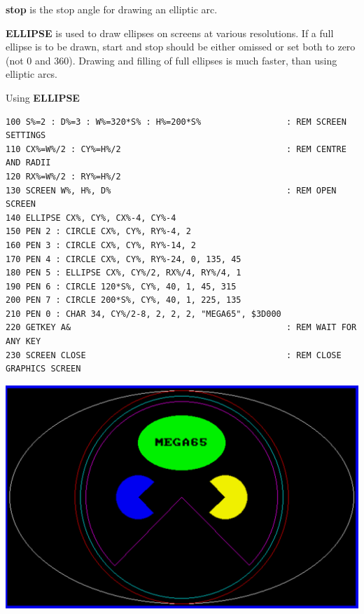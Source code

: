 \begin{description}[leftmargin=2cm,style=nextline]
                  {\bf stop} is the stop angle for drawing an elliptic arc.

\item [Remarks:]  {\bf ELLIPSE} is used to draw ellipses on screens at various resolutions. If a full ellipse is to be drawn, start and stop should be either omissed or set both to zero (not 0 and 360). Drawing and filling of full ellipses is much faster, than using elliptic arcs.

\item [Example:]  Using {\bf ELLIPSE}

\begin{tcolorbox}[colback=black,coltext=white]
\verbatimfont{\codefont}
\begin{verbatim}
100 S%=2 : D%=3 : W%=320*S% : H%=200*S%                 : REM SCREEN SETTINGS
110 CX%=W%/2 : CY%=H%/2                                 : REM CENTRE AND RADII
120 RX%=W%/2 : RY%=H%/2
130 SCREEN W%, H%, D%                                   : REM OPEN SCREEN
140 ELLIPSE CX%, CY%, CX%-4, CY%-4
150 PEN 2 : CIRCLE CX%, CY%, RY%-4, 2
160 PEN 3 : CIRCLE CX%, CY%, RY%-14, 2
170 PEN 4 : CIRCLE CX%, CY%, RY%-24, 0, 135, 45
180 PEN 5 : ELLIPSE CX%, CY%/2, RX%/4, RY%/4, 1
190 PEN 6 : CIRCLE 120*S%, CY%, 40, 1, 45, 315
200 PEN 7 : CIRCLE 200*S%, CY%, 40, 1, 225, 135
210 PEN 0 : CHAR 34, CY%/2-8, 2, 2, 2, "MEGA65", $3D000
220 GETKEY A&                                           : REM WAIT FOR ANY KEY
230 SCREEN CLOSE                                        : REM CLOSE GRAPHICS SCREEN
\end{verbatim}
\end{tcolorbox}

\item \begin{center}\includegraphics[width=0.7\linewidth]{images/ellipse.png}\end{center}
\end{description}


